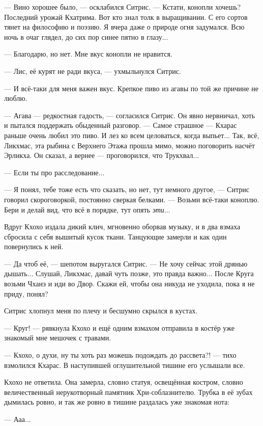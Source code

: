 --- Вино хорошее было, --- осклабился Ситрис.
--- Кстати, конопли хочешь?
Последний урожай Кхатрима.
Вот кто знал толк в выращивании.
С его сортов тянет на философию и поэзию.
Я вчера даже о природе огня задумался.
Всю ночь в очаг глядел, до сих пор синее пятно в глазу...

--- Благодарю, но нет.
Мне вкус конопли не нравится.

--- Лис, её курят не ради вкуса, --- ухмыльнулся Ситрис.

--- И всё-таки для меня важен вкус.
Крепкое пиво из агавы по той же причине не люблю.

--- Агава --- редкостная гадость, --- согласился Ситрис.
Он явно нервничал, хоть и пытался поддержать обыденный разговор.
--- Самое страшное --- Кхарас раньше очень любил это пиво.
И лез ко всем целоваться, когда выпьет...
Так, всё, Ликхмас, эта рыбина с Верхнего Этажа прошла мимо, можно поговорить насчёт Эрликха.
Он сказал, а вернее --- проговорился, что Трукхвал...

--- Если ты про расследование...

--- Я понял, тебе тоже есть что сказать, но нет, тут немного другое, --- Ситрис говорил скороговоркой, постоянно сверкая белками.
--- Возьми всё-таки коноплю.
Бери и делай вид, что всё в порядке, тут опять \emph{эти}...

Вдруг Кхохо издала дикий клич, мгновенно оборвав музыку, и в два взмаха сбросила с себя вышитый кусок ткани.
Танцующие замерли и как один повернулись к ней.

--- Да чтоб её, --- шепотом выругался Ситрис.
--- Не хочу сейчас этой дрянью дышать...
Слушай, Ликхмас, давай чуть позже, это правда важно...
После Круга возьми Чханэ и иди во Двор.
Скажи ей, чтобы она никуда не уходила, пока я не приду, понял?

Ситрис хлопнул меня по плечу и бесшумно скрылся в кустах.

--- Круг! --- рявкнула Кхохо и ещё одним взмахом отправила в костёр уже знакомый мне мешочек с травами.

--- Кхохо, о духи, ну ты хоть раз можешь подождать до рассвета?! --- тихо взмолился Кхарас.
В наступившей оглушительной тишине его услышали все.

Кхохо не ответила.
Она замерла, словно статуя, освещённая костром, словно величественный нерукотворный памятник Хри-соблазнителю.
Трубка в её зубах дымилась ровно, и так же ровно в тишине раздалась уже знакомая нота:

--- Ааа...

